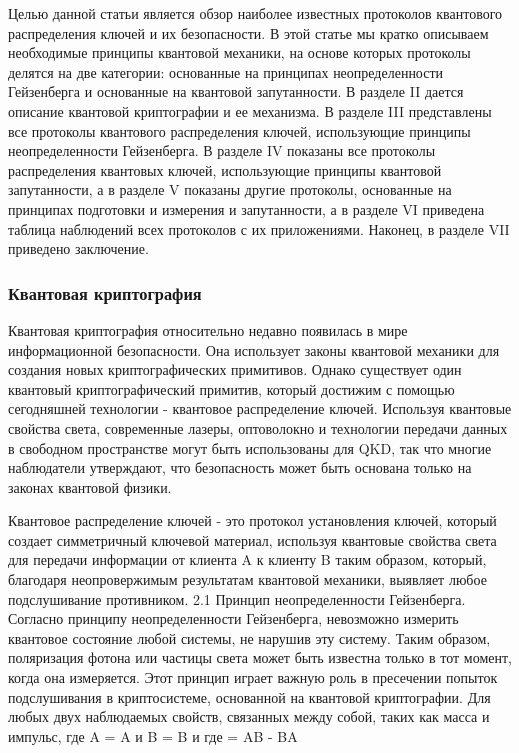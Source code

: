 Целью данной статьи является обзор наиболее известных протоколов квантового распределения ключей и их безопасности. В этой статье мы кратко описываем необходимые принципы квантовой механики, на основе которых протоколы делятся на две категории: основанные на принципах неопределенности Гейзенберга и основанные на квантовой запутанности. В разделе II дается описание квантовой криптографии и ее механизма. В разделе III представлены все протоколы квантового распределения ключей, использующие принципы неопределенности Гейзенберга. В разделе IV показаны все протоколы распределения квантовых ключей, использующие принципы квантовой запутанности, а в разделе V показаны другие протоколы, основанные на принципах подготовки и измерения и запутанности, а в разделе VI приведена таблица наблюдений всех протоколов с их приложениями. Наконец, в разделе VII приведено заключение.

\subsubsection{Квантовая криптография}
Квантовая криптография относительно недавно появилась в мире информационной безопасности. Она использует законы квантовой механики для создания новых криптографических примитивов. Однако существует один квантовый криптографический примитив, который достижим с помощью сегодняшней технологии - квантовое распределение ключей. Используя квантовые свойства света, современные лазеры, оптоволокно и технологии передачи данных в свободном пространстве могут быть использованы для QKD, так что многие наблюдатели утверждают, что безопасность может быть основана только на законах квантовой физики.

Квантовое распределение ключей - это протокол установления ключей, который создает симметричный ключевой материал, используя квантовые свойства света для передачи информации от клиента A к клиенту B таким образом, который, благодаря неопровержимым результатам квантовой механики, выявляет любое подслушивание противником.
2.1 Принцип неопределенности Гейзенберга. Согласно принципу неопределенности Гейзенберга, невозможно измерить квантовое состояние любой системы, не нарушив эту систему. Таким образом, поляризация фотона или частицы света может быть известна только в тот момент, когда она измеряется. Этот принцип играет важную роль в пресечении попыток подслушивания в криптосистеме, основанной на квантовой криптографии.
Для любых двух наблюдаемых свойств, связанных между собой, таких как масса и импульс, где A = A и B = B и где = AB - BA


